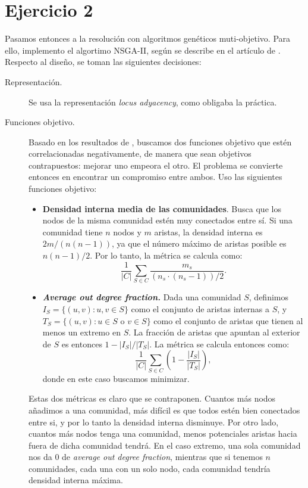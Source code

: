 \section{Ejercicio 2}\label{sec:ej2}

Pasamos entonces a la resolución con algoritmos genéticos muti-objetivo. Para
ello, implemento el algortimo NSGA-II, según se describe en el artículo de
\citeauthor{deb2002fastelitist} \cite{deb2002fastelitist}. Respecto al diseño,
se toman las siguientes decisiones:

\begin{description}
  \item[Representación.] Se usa la representación \emph{locus adyacency}, como
    obligaba la práctica.
  \item[Funciones objetivo.] Basado en los resultados de
    \citeauthor{shi2014Comparisonselection} \cite{shi2014Comparisonselection},
    buscamos dos funciones objetivo que estén correlacionadas negativamente,
    de manera que sean objetivos contrapuestos: mejorar uno empeora el otro.
    El problema se convierte entonces en encontrar un compromiso entre ambos.
    Uso las siguientes funciones objetivo:
    \begin{itemize}
      \item \textbf{Densidad interna media de las comunidades}. Busca que los nodos de
        la misma comunidad estén muy conectados entre sí. Si una comunidad tiene
        \(n\) nodos y \(m\) aristas, la densidad interna es \(2m/(n(n-1))\), ya que
        el número máximo de aristas posible es \(n(n-1)/2\). Por lo tanto, la métrica
        se calcula como:
        $$
        \frac{1}{|C|} \sum_{S \in C} \frac{m_s}{(n_s \cdot (n_s-1)) / 2}
        .$$

      \item \textbf{\emph{Average out degree fraction.}} Dada una comunidad \(S\),
        definimos \(I_S = \{ (u,v): u,v\in S \}\) como el conjunto de aristas internas
        a \(S\), y \(T_S = \{ (u,v): u\in S \text{ o } v \in S\}\) como el conjunto
        de aristas que tienen al menos un extremo en \(S\). La fracción de aristas
        que apuntan al exterior de \(S\) es entonces \(1 - |I_S| / |T_S|\). La métrica
        se calcula entonces como:
        $$
        \frac{1}{|C|} \sum_{S \in C} \left(1 - \frac {|I_S|} {|T_S|} \right)
        ,$$
        donde en este caso buscamos minimizar.
    \end{itemize}

    Estas dos métricas es claro que se contraponen. Cuantos más nodos añadimos a una
    comunidad, más difícil es que todos estén bien conectados entre si, y por lo tanto
    la densidad interna disminuye. Por otro lado, cuantos más nodos tenga una
    comunidad, menos potenciales aristas hacia fuera de dicha comunidad tendrá. En el
    caso extremo, una sola comunidad nos da \(0\) de \emph{average out degree fraction},
    mientras que si tenemos \(n\) comunidades, cada una con un solo nodo, cada comunidad
    tendría densidad interna máxima.


\end{description}
